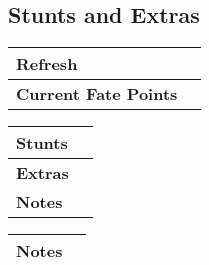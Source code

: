 \documentclass[12pt,a4paper]{article}
\newcommand{\MyTextField}[2][]{%
  \TextField[borderwidth=0,backgroundcolor={},#1]{#2}%
}
\begin{document}
\newpage
\subsection*{Stunts and Extras}
\begin{tabular}{|l|m{2cm}|}
\hline
\textbf{Refresh} & \MyTextField[name=Refresh,width=\linewidth]{}\\ \hline
\textbf{Current Fate Points} & \MyTextField[name=CurrentFatePoints,width=\linewidth]{}\\ \hline
\end{tabular}

\vspace{1.5cm}

\begin{tabularx}{\linewidth}{|l|X|}
\hline
\textbf{Stunts} & \MyTextField[multiline=true,name=Stunts,width=\linewidth,height=6cm]{}\\ 
\hline
\textbf{Extras} & \MyTextField[multiline=true,name=Extras,width=\linewidth,height=6cm]{} \\ 
\hline
\textbf{Notes} & \MyTextField[multiline=true,name=Notes,width=\linewidth,height=10cm]{} \\ 
\hline
\end{tabularx}

\newpage

\begin{tabularx}{\linewidth}{|l|X|}
\hline
\textbf{Notes} & \MyTextField[multiline=true,name=Notes2,width=\linewidth,height=26cm]{} \\ 
\hline
\end{tabularx}
\end{document}

